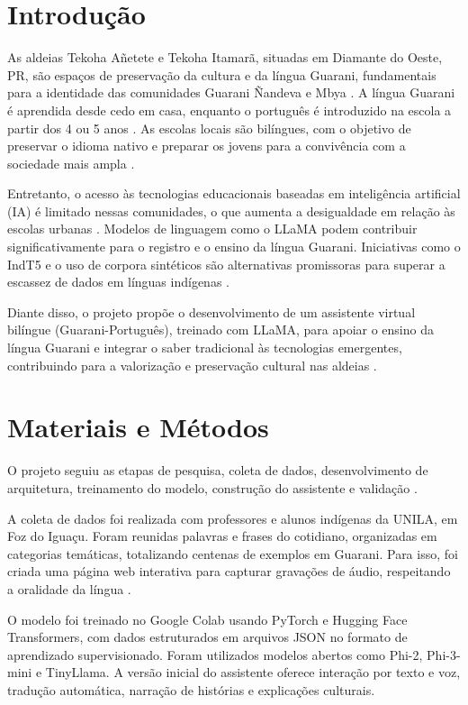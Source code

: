 \documentclass[12pt]{article}
\begin{document}
\section{Introdução}
As aldeias Tekoha Añetete e Tekoha Itamarã, situadas em Diamante do Oeste, PR, são espaços de preservação da cultura e da língua Guarani, fundamentais para a identidade das comunidades Guarani Ñandeva e Mbya \cite{mendonca2019atitudes}. A língua Guarani é aprendida desde cedo em casa, enquanto o português é introduzido na escola a partir dos 4 ou 5 anos \cite{funai2018licoes}. As escolas locais são bilíngues, com o objetivo de preservar o idioma nativo e preparar os jovens para a convivência com a sociedade mais ampla \cite{ibge2023censo}.

Entretanto, o acesso às tecnologias educacionais baseadas em inteligência artificial (IA) é limitado nessas comunidades, o que aumenta a desigualdade em relação às escolas urbanas \cite{isotani2023chatgpt}. Modelos de linguagem como o LLaMA podem contribuir significativamente para o registro e o ensino da língua Guarani. Iniciativas como o IndT5 \cite{nagoudi2021indt5} e o uso de corpora sintéticos são alternativas promissoras para superar a escassez de dados em línguas indígenas \cite{lucas2024grammar}.

Diante disso, o projeto propõe o desenvolvimento de um assistente virtual bilíngue (Guarani-Português), treinado com LLaMA, para apoiar o ensino da língua Guarani e integrar o saber tradicional às tecnologias emergentes, contribuindo para a valorização e preservação cultural nas aldeias \cite{mota2008populacoes}.

\section{Materiais e Métodos}
O projeto seguiu as etapas de pesquisa, coleta de dados, desenvolvimento de arquitetura, treinamento do modelo, construção do assistente e validação \cite{souza2016proposta}.

A coleta de dados foi realizada com professores e alunos indígenas da UNILA, em Foz do Iguaçu. Foram reunidas palavras e frases do cotidiano, organizadas em categorias temáticas, totalizando centenas de exemplos em Guarani. Para isso, foi criada uma página web interativa para capturar gravações de áudio, respeitando a oralidade da língua \cite{funai2016licoes}.

O modelo foi treinado no Google Colab usando PyTorch e Hugging Face Transformers, com dados estruturados em arquivos JSON no formato de aprendizado supervisionado. Foram utilizados modelos abertos como Phi-2, Phi-3-mini e TinyLlama. A versão inicial do assistente oferece interação por texto e voz, tradução automática, narração de histórias e explicações culturais.
\end{document}
